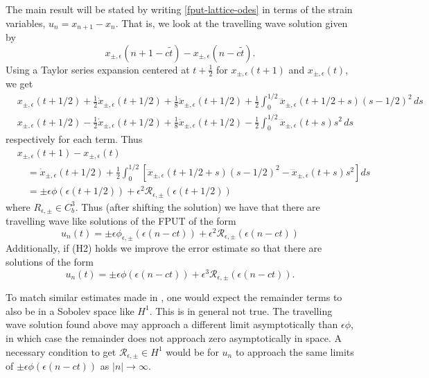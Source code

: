 The main result will be stated by writing \cref{fput-lattice-odes} in terms of the strain variables, \(u_n = x_{n+1} - x_n\). That is, we look at the travelling wave solution given by 
\begin{equation}
	x_{\pm, \epsilon}(n+1-c\tilde t) - x_{\pm, \epsilon}(n-c\tilde t).
\end{equation}
Using a Taylor series expansion centered at \(t + \frac 12 \) for \( x_{\pm, \epsilon}(t+ 1)\) and \( x_{\pm, \epsilon}(t)\), we get 
\begin{align}
	& x_{\pm, \epsilon}(t+ 1/2) + \frac 12 \dot x_{\pm, \epsilon}(t+1/2) + \frac 1 8\ddot x_{\pm, \epsilon}(t+1/2) + \frac 1 2\int_{0}^{1/2} \dddot x_{\pm, \epsilon}(t+1/2+s)(s-1/2)^2 \, ds \\
	& x_{\pm, \epsilon}(t+ 1/2) - \frac 12 \dot x_{\pm, \epsilon}(t+1/2) + \frac 1 8 \ddot x_{\pm, \epsilon}(t+1/2) - \frac 1 2\int_0^{1/2} \dddot x_{\pm, \epsilon}(t+s)s^2 \, ds 
\end{align}
respectively for each term. Thus 
\begin{equation}
\begin{aligned}
	&x_{\pm, \epsilon}(t+1) - x_{\pm, \epsilon}(t) \\
	&\quad= \dot x_{\pm, \epsilon}(t+ 1/2) + \frac 12 \int_{0}^{1/2} [\dddot x_{\pm, \epsilon}(t+1/2+s)(s-1/2)^2 - \dddot x_{\pm, \epsilon}(t+s)s^2] ds \\
	&\quad= \pm \epsilon \phi(\epsilon (t+1/2)) + \epsilon^2 \mathcal R_{\epsilon, \pm}(\epsilon (t+1/2))
\end{aligned}
\end{equation}
where \(R_{\epsilon, \pm} \in C^3_b\). Thus (after shifting the solution) we have that there are travelling wave like solutions of the FPUT of the form
\begin{equation}
	u_n(t) = \pm \epsilon \phi_{\epsilon, \pm}(\epsilon(n-ct)) + \epsilon^2 \mathcal R_{\epsilon, \pm}(\epsilon (n-ct))
\end{equation}
Additionally, if (H2) holds we improve the error estimate so that there are solutions of the form 
\begin{equation}
	u_n(t) = \pm \epsilon \phi(\epsilon(n-ct)) + \epsilon^3 \mathcal R_{\epsilon, \pm}(\epsilon (n-ct)).
\end{equation}

To match similar estimates made in \cite{friesecke1999solitary}, one would expect the remainder terms to also be in a Sobolev space like \(H^1\). This is in general not true. The travelling wave solution found above may approach a different limit asymptotically than \(\epsilon \phi \), in which case the remainder does not approach zero asymptotically in space. A necessary condition to get \(\mathcal R_{\epsilon,\pm}\in H^1\) would be for \(u_n\) to approach the same limits of \(\pm \epsilon \phi(\epsilon (n-ct))\) as \(|n| \to \infty\).

